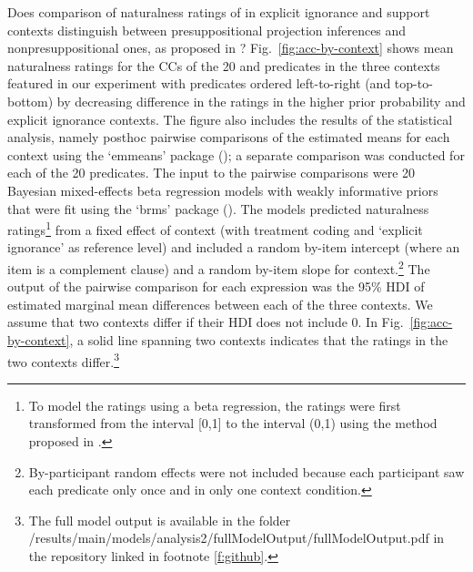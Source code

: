 \documentclass[11pt,fleqn]{article}
\newcommand{\6}{\mbox{$[\hspace*{-.6mm}[$}}
\newcommand{\9}{\mbox{$]\hspace*{-.6mm}]$}}
\begin{document}
Does comparison of naturalness ratings of in explicit ignorance and support contexts distinguish between presuppositional projection inferences and nonpresuppositional ones, as proposed in \citealt{mandelkern-etal2020}? Fig.~\ref{fig:acc-by-context} shows mean naturalness ratings for the CCs of the 20  and  predicates in the three contexts featured in our experiment with predicates ordered left-to-right (and top-to-bottom) by decreasing difference in the ratings in the higher prior probability and explicit ignorance contexts. The figure also includes the results of the statistical analysis, namely posthoc pairwise comparisons of the estimated means for each context using the `emmeans' package (\citealt{emmeans}); a separate comparison was conducted for each of the 20 predicates. The input to the pairwise comparisons were 20 Bayesian mixed-effects beta regression models with weakly informative priors that were fit using the `brms' package (\citealt{buerkner2017}). The models predicted  naturalness ratings\footnote{\label{fn:transform}To model the ratings using a beta regression, the ratings were first transformed from the interval [0,1] to the interval (0,1) using the method proposed in \citealt{smithson-verkuilen2006}.} from a fixed effect of context (with treatment coding and `explicit ignorance' as reference level) and included a random by-item intercept (where an item is a complement clause) and a random by-item slope for context.\footnote{By-participant random effects were not included because each participant saw each predicate only once and in only one context condition.} The output of the pairwise comparison for each expression was the 95\% HDI of estimated marginal mean differences between each of the three contexts. We assume that two contexts differ if their HDI does not include 0. In Fig.~\ref{fig:acc-by-context}, a solid line spanning two contexts indicates that the ratings in the two contexts differ.\footnote{The full model output is available in the folder /results/main/models/analysis2/fullModelOutput/fullModelOutput.pdf in the repository linked in footnote \ref{f:github}.}
\end{document}
